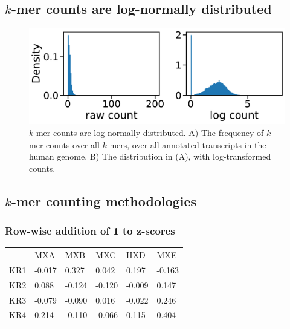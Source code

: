 \subsection{$k$-mer counts are log-normally distributed}
\begin{figure}[h!]
\centering
\includegraphics[width=\textwidth]{images/kmers_log_dist.pdf}
\caption{$k$-mer counts are log-normally distributed. A) The frequency of $k$-mer counts over all $k$-mers, over all annotated transcripts in the human genome. B) The distribution in (A), with log-transformed counts.}
\label{fig:logdist}
\end{figure}

\subsection{$k$-mer counting methodologies}

\subsubsection{Row-wise addition of 1 to z-scores}

\begin{table}[h!]
\begin{tabular}{llllll}
&MXA & MXB                   & MXC                  & HXD                  & MXE                                  \\
KR1 & -0.017 & 0.327   & 0.042  & 0.197    & -0.163 \\
KR2 & 0.088   & -0.124 & -0.120 & -0.009 & 0.147 \\
KR3 & -0.079  & -0.090 & 0.016 & -0.022 & 0.246 \\
KR4 & 0.214    & -0.110 & -0.066  & 0.115   & 0.404
\end{tabular}
\end{table}

